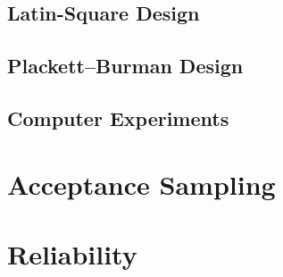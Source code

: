 \documentclass[12pt,a4paper]{report}
\begin{document}
\section{Latin-Square Design}
\section{Plackett–Burman Design}
\section{Computer Experiments}



\chapter{Acceptance Sampling}




\chapter{Reliability}


\newpage

\appendix







\newpage
{}


%
\label{sec:bibliography}
\end{document}
